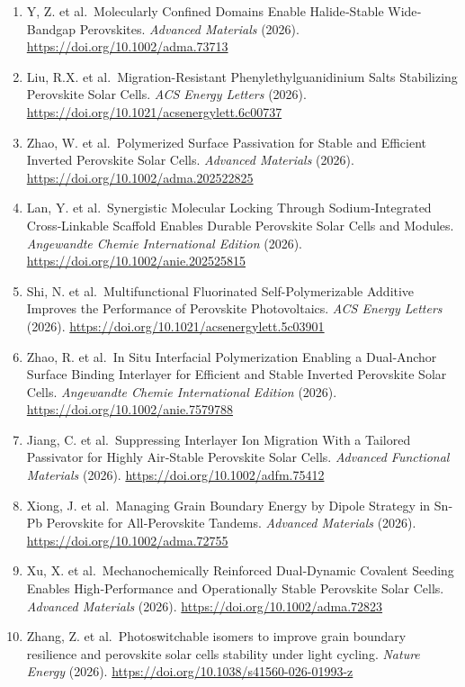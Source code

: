 \documentclass[
  11pt,
]{article}
\begin{document}
\begin{enumerate}
\item
  Y, Z. et al.~Molecularly Confined Domains Enable Halide‐Stable
  Wide‐Bandgap Perovskites. \emph{Advanced Materials} (2026).
  \url{https://doi.org/10.1002/adma.73713}
\item
  Liu, R.X. et al.~Migration-Resistant Phenylethylguanidinium Salts
  Stabilizing Perovskite Solar Cells. \emph{ACS Energy Letters} (2026).
  \url{https://doi.org/10.1021/acsenergylett.6c00737}
\item
  Zhao, W. et al.~Polymerized Surface Passivation for Stable and
  Efficient Inverted Perovskite Solar Cells. \emph{Advanced Materials}
  (2026). \url{https://doi.org/10.1002/adma.202522825}
\item
  Lan, Y. et al.~Synergistic Molecular Locking Through Sodium‐Integrated
  Cross‐Linkable Scaffold Enables Durable Perovskite Solar Cells and
  Modules. \emph{Angewandte Chemie International Edition} (2026).
  \url{https://doi.org/10.1002/anie.202525815}
\item
  Shi, N. et al.~Multifunctional Fluorinated Self-Polymerizable Additive
  Improves the Performance of Perovskite Photovoltaics. \emph{ACS Energy
  Letters} (2026). \url{https://doi.org/10.1021/acsenergylett.5c03901}
\item
  Zhao, R. et al.~In Situ Interfacial Polymerization Enabling a
  Dual‐Anchor Surface Binding Interlayer for Efficient and Stable
  Inverted Perovskite Solar Cells. \emph{Angewandte Chemie International
  Edition} (2026). \url{https://doi.org/10.1002/anie.7579788}
\item
  Jiang, C. et al.~Suppressing Interlayer Ion Migration With a Tailored
  Passivator for Highly Air‐Stable Perovskite Solar Cells.
  \emph{Advanced Functional Materials} (2026).
  \url{https://doi.org/10.1002/adfm.75412}
\item
  Xiong, J. et al.~Managing Grain Boundary Energy by Dipole Strategy in
  Sn‐Pb Perovskite for All‐Perovskite Tandems. \emph{Advanced Materials}
  (2026). \url{https://doi.org/10.1002/adma.72755}
\item
  Xu, X. et al.~Mechanochemically Reinforced Dual‐Dynamic Covalent
  Seeding Enables High‐Performance and Operationally Stable Perovskite
  Solar Cells. \emph{Advanced Materials} (2026).
  \url{https://doi.org/10.1002/adma.72823}
\item
  Zhang, Z. et al.~Photoswitchable isomers to improve grain boundary
  resilience and perovskite solar cells stability under light cycling.
  \emph{Nature Energy} (2026).
  \url{https://doi.org/10.1038/s41560-026-01993-z}

\end{enumerate}
\end{document}
